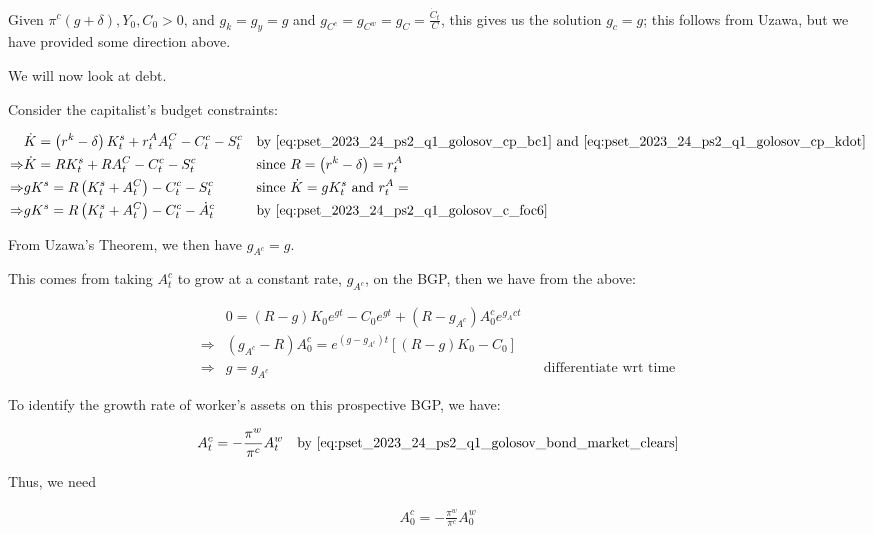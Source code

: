 Given $\pi^c(g+\delta), Y_0, C_0>0$, and $g_k = g_y = g$ and $g_{C^c} = g_{C^w} = g_C = \frac{\dot{C}_t}{C}$, this gives us the solution $g_c = g$; 
this follows from Uzawa, but we have provided some direction above. 

We will now look at debt.

Consider the capitalist's budget constraints:

\begin{align}
    &\dot{K} = \left(r^k-\delta\right) K^s_t+r_t^A A_t^C-C_t^c-S_t^c && \text{by \eqref{eq:pset_2023_24_ps2_q1_golosov_cp_bc1} and \eqref{eq:pset_2023_24_ps2_q1_golosov_cp_kdot}} \\
    \Rightarrow &\dot{K}=R K^s_t+R A_t^C-C_t^c-S_t^c && \text{since } R = \left(r^k-\delta\right) = r_t^A \\
    \Rightarrow &g K^s=R\left(K^s_t+A_t^C\right)-C_t^c-S_t^c && \text{since $\dot{K} = gK^s_t$ and $r_t^A = $} \\
    \Rightarrow &g K^s=R\left(K^s_t+A_t^C\right)-C_t^c-\dot{A}_t^c && \text{by \eqref{eq:pset_2023_24_ps2_q1_golosov_c_foc6}} \\
\end{align}

From Uzawa's Theorem, we then have $g_{A^c} = g$.

This comes from taking $A_t^c$ to grow at a constant rate, $g_{A^c}$, on the BGP,
then we have from the above:

\begin{align}
        &0= (R-g) K_0 e^{g t}-C_0 e^{g t}+\left(R-g_{A^c}\right) A_0^c e^{g_A c t} \\
        \Rightarrow & \left(g_{A^c}-R\right) A_0^c=e^{\left(g-g_{A^c}\right) t}\left[(R-g) K_0-C_0\right] \\
        \Rightarrow &g=g_{A^c} && \text {differentiate wrt time} 
\end{align}

To identify the growth rate of worker's assets on this prospective BGP,
we have:

\begin{align}
    A_t^c &= -\frac{\pi^w}{\pi^c} A_t^w && \text{by \eqref{eq:pset_2023_24_ps2_q1_golosov_bond_market_clears}} \\
\end{align}

Thus, we need 

\begin{align}
    A_0^c=-\frac{\pi^w}{\pi^c} A_0^w
\end{align}

